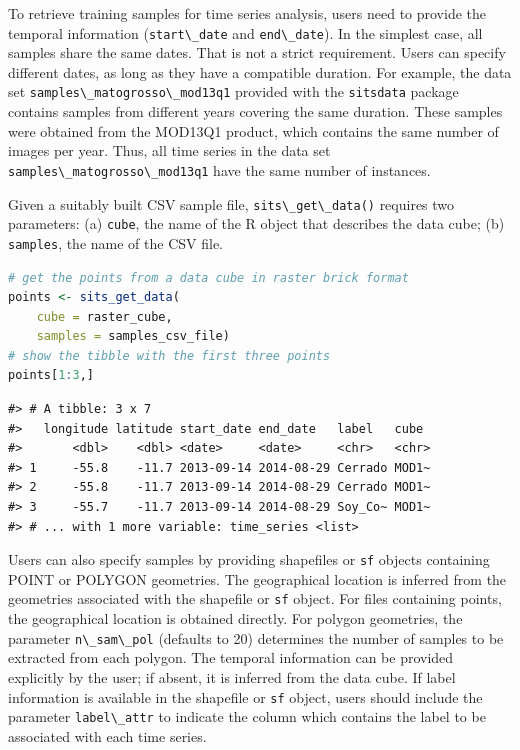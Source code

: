 \documentclass[
  11pt,
]{report}
\newcommand{\passthrough}[1]{#1}
\begin{document}
To retrieve training samples for time series analysis, users need to
provide the temporal information (\passthrough{\lstinline!start\_date!}
and \passthrough{\lstinline!end\_date!}). In the simplest case, all
samples share the same dates. That is not a strict requirement. Users
can specify different dates, as long as they have a compatible duration.
For example, the data set
\passthrough{\lstinline!samples\_matogrosso\_mod13q1!} provided with the
\passthrough{\lstinline!sitsdata!} package contains samples from
different years covering the same duration. These samples were obtained
from the MOD13Q1 product, which contains the same number of images per
year. Thus, all time series in the data set
\passthrough{\lstinline!samples\_matogrosso\_mod13q1!} have the same
number of instances.

Given a suitably built CSV sample file,
\passthrough{\lstinline!sits\_get\_data()!} requires two parameters: (a)
\passthrough{\lstinline!cube!}, the name of the R object that describes
the data cube; (b) \passthrough{\lstinline!samples!}, the name of the
CSV file.

\begin{lstlisting}[language=R]
# get the points from a data cube in raster brick format
points <- sits_get_data(
    cube = raster_cube, 
    samples = samples_csv_file)
# show the tibble with the first three points
points[1:3,]
\end{lstlisting}

\begin{lstlisting}
#> # A tibble: 3 x 7
#>   longitude latitude start_date end_date   label   cube 
#>       <dbl>    <dbl> <date>     <date>     <chr>   <chr>
#> 1     -55.8    -11.7 2013-09-14 2014-08-29 Cerrado MOD1~
#> 2     -55.8    -11.7 2013-09-14 2014-08-29 Cerrado MOD1~
#> 3     -55.7    -11.7 2013-09-14 2014-08-29 Soy_Co~ MOD1~
#> # ... with 1 more variable: time_series <list>
\end{lstlisting}

\newpage

Users can also specify samples by providing shapefiles or
\passthrough{\lstinline!sf!} objects containing POINT or POLYGON
geometries. The geographical location is inferred from the geometries
associated with the shapefile or \passthrough{\lstinline!sf!} object.
For files containing points, the geographical location is obtained
directly. For polygon geometries, the parameter
\passthrough{\lstinline!n\_sam\_pol!} (defaults to 20) determines the
number of samples to be extracted from each polygon. The temporal
information can be provided explicitly by the user; if absent, it is
inferred from the data cube. If label information is available in the
shapefile or \passthrough{\lstinline!sf!} object, users should include
the parameter \passthrough{\lstinline!label\_attr!} to indicate the
column which contains the label to be associated with each time series.
\end{document}
